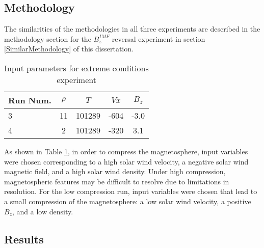 
\subsection{Methodology}
The similarities of the methodologies in all three experiments are described in
the methodology section for the $B_z^{IMF}$ reversal experiment in section
\ref{SimilarMethodology} of this dissertation. 

\begin{table}
\begin{center}
  \caption{Input parameters for extreme conditions experiment}
  \begin{tabular}{| l | c | c | c | c | }
    \hline
    \textbf{Run Num.} & \textbf{$\rho$} & \textbf{$T$} & \textbf{$Vx$} &
    \textbf{$B_z$}
    \\
    \hline 
    3 & 11 & 101289 & -604  & -3.0 \\ \hline
    4 & 2 & 101289 & -320  & 3.1 \\ \hline
  \end{tabular}
  \label{table:runs34}
\end{center}
\end{table}
As shown in Table \ref{table:runs34}, in order to compress the magnetosphere,
input variables were chosen corresponding to a high solar wind velocity, a negative
solar wind magnetic field, and a high solar wind density. Under high
compression, magnetospheric features may be difficult to resolve due to limitations in resolution.  For the low compression run, input variables were chosen that lead to a small
compression of the magnetosphere: a low solar wind velocity, a positive $B_z$,
and a low density.

\subsection{Results}
